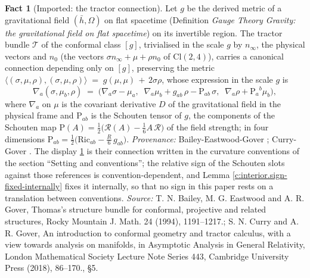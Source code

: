 \documentclass[11pt]{article}
\theoremstyle{definition}
\newtheorem{fact}[theorem]{Fact}
\theoremstyle{plain}
\newcommand{\changedmark}[2]{\marginpar{\raggedright\scriptsize\color{#1}#2}}
\providecommand{\Cl}{}\renewcommand{\Cl}{\mathrm{Cl}}
\providecommand{\Ric}{}\renewcommand{\Ric}{\mathrm{Ric}}
\providecommand{\Sch}{}\renewcommand{\Sch}{\mathrm{P}}
\providecommand{\hb}{}\renewcommand{\hb}{\bar{h}}
\providecommand{\nInf}{}\renewcommand{\nInf}{n_\infty}
\providecommand{\nO}{}\renewcommand{\nO}{n_0}
\providecommand{\ip}{}\renewcommand{\ip}[2]{\langle #1, #2\rangle}
\begin{document}
\begin{fact}[Imported: the tractor connection]\label{c:interior.imported-tractor-connection}
\changedmark{gray}{reworded}
Let $g$ be the derived metric of a gravitational field $(\hb, \Omega)$ on flat spacetime (Definition \emph{Gauge Theory Gravity: the gravitational field on flat spacetime}) on its invertible region. The tractor bundle $\mathcal{T}$ of the conformal class $[g]$, trivialised in the scale $g$ by $\nInf$, the physical vectors and $\nO$ (the vectors $\sigma\nInf + \mu + \rho\nO$ of $\Cl(2,4)$), carries a canonical connection depending only on $[g]$, preserving the metric $\ip{(\sigma,\mu,\rho)}{(\sigma,\mu,\rho)} \;=\; g(\mu,\mu) \,+\, 2\sigma\rho$, whose expression in the scale $g$ is
\begin{equation}
\nabla_a(\sigma, \mu_b, \rho) \;=\; \bigl(\nabla_a\sigma - \mu_a,\;\; \nabla_a\mu_b + g_{ab}\,\rho - \Sch_{ab}\,\sigma,\;\; \nabla_a\rho + \Sch_a{}^{b}\mu_b\bigr),
\end{equation}
where $\nabla_a$ on $\mu$ is the covariant derivative $D$ of the gravitational field in the physical frame and $\Sch_{ab}$ is the Schouten tensor of $g$, the components of the Schouten map $\Sch(A) = \tfrac12\bigl(\mathcal{R}(A) - \tfrac16 A\,\mathcal{R}\bigr)$ of the field strength; in four dimensions $\Sch_{ab} = \tfrac12\bigl(\Ric_{ab} - \tfrac{R}{6}\,g_{ab}\bigr)$. \emph{Provenance:} Bailey-Eastwood-Gover \cite{BEG1994}; Curry-Gover \cite[\S 5]{CurryGover2018}. The display \ref{c:interior.imported-tractor-connection} is their connection written in the curvature conventions of the section ``Setting and conventions''; the relative sign of the Schouten slots against those references is convention-dependent, and Lemma \ref{c:interior.sign-fixed-internally} fixes it internally, so that no sign in this paper rests on a translation between conventions.
\emph{Source:} T. N. Bailey, M. G. Eastwood and A. R. Gover, Thomas's structure bundle for conformal, projective and related structures, Rocky Mountain J. Math. 24 (1994), 1191--1217.; S. N. Curry and A. R. Gover, An introduction to conformal geometry and tractor calculus, with a view towards analysis on manifolds, in Asymptotic Analysis in General Relativity, London Mathematical Society Lecture Note Series 443, Cambridge University Press (2018), 86--170., \S 5.
\end{fact}
\end{document}
